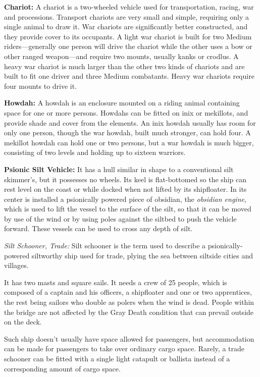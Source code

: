 \textbf{Chariot:} A chariot is a two-wheeled vehicle used for transportation, racing, war and processions. Transport chariots are very small and simple, requiring only a single animal to draw it. War chariots are significantly better constructed, and they provide cover to its occupants. A light war chariot is built for two Medium riders---generally one person will drive the chariot while the other uses a bow or other ranged weapon---and require two mounts, usually kanks or crodlus. A heavy war chariot is much larger than the other two kinds of chariots and are built to fit one driver and three Medium combatants. Heavy war chariots require four mounts to drive it.

\textbf{Howdah:} A howdah is an enclosure mounted on a riding animal containing space for one or more persons. Howdahs can be fitted on inix or mekillots, and provide shade and cover from the elements. An inix howdah usually has room for only one person, though the war howdah, built much stronger, can hold four. A mekillot howdah can hold one or two persons, but a war howdah is much bigger, consisting of two levels and holding up to sixteen warriors.

\textbf{Psionic Silt Vehicle:} It has a hull similar in shape to a conventional silt skimmer's, but it possesses no wheels. Its keel is flat-bottomed so the ship can rest level on the coast or while docked when not lifted by its shipfloater. In its center is installed a psionically powered piece of obsidian, the \emph{obsidian engine}, which is used to lift the vessel to the surface of the silt, so that it can be moved by use of the wind or by using poles against the siltbed to push the vehicle forward. These vessels can be used to cross any depth of silt.

\textit{Silt Schooner, Trade:} Silt schooner is the term used to describe a psionically-powered siltworthy ship used for trade, plying the sea between siltside cities and villages.

It has two masts and square sails. It needs a crew of 25 people, which is composed of a captain and his officers, a shipfloater and one or two apprentices, the rest being sailors who double as polers when the wind is dead. People within the bridge are not affected by the Gray Death condition that can prevail outside on the deck.

Such ship doesn't usually have space allowed for passengers, but accommodation can be made for passengers to take over ordinary cargo space. Rarely, a trade schooner can be fitted with a single light catapult or ballista instead of a corresponding amount of cargo space.

